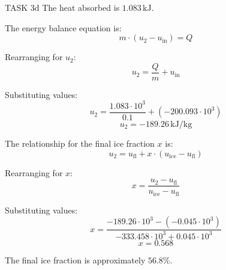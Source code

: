TASK 3d  
The heat absorbed is \( 1.083 \, \text{kJ} \).  

The energy balance equation is:  
\[
m \cdot (u_2 - u_{\text{in}}) = Q
\]

Rearranging for \( u_2 \):  
\[
u_2 = \frac{Q}{m} + u_{\text{in}}
\]

Substituting values:  
\[
u_2 = \frac{1.083 \cdot 10^3}{0.1} + (-200.093 \cdot 10^3)
\]  
\[
u_2 = -189.26 \, \text{kJ/kg}
\]

The relationship for the final ice fraction \( x \) is:  
\[
u_2 = u_{\text{fl}} + x \cdot (u_{\text{ice}} - u_{\text{fl}})
\]

Rearranging for \( x \):  
\[
x = \frac{u_2 - u_{\text{fl}}}{u_{\text{ice}} - u_{\text{fl}}}
\]

Substituting values:  
\[
x = \frac{-189.26 \cdot 10^3 - (-0.045 \cdot 10^3)}{-333.458 \cdot 10^3 + 0.045 \cdot 10^3}
\]  
\[
x = 0.568
\]

The final ice fraction is approximately \( 56.8\% \).
